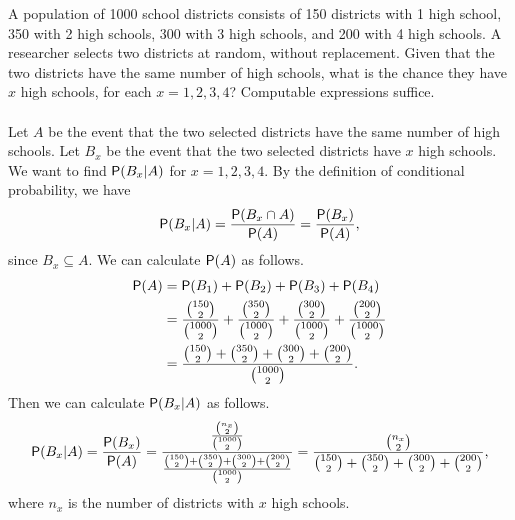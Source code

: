 \documentclass[12pt]{article}
\newcommand{\Prob}{{\sf P}}
\newenvironment{problem}[2][Problem]{\begin{trivlist}
\item[\hskip \labelsep {\bfseries #1}\hskip \labelsep {\bfseries #2.}]}
{\end{trivlist}}
\begin{document}
\begin{problem}{2}
  A population of 1000 school districts consists of 150 districts with 
  1 high school, 350 with 2 high schools, 300 with 3 high schools, 
  and 200 with 4 high schools. A researcher selects two districts at random, 
  without replacement. Given that the two districts
  have the same number of high schools, what is the chance 
  they have $x$ high schools, for each
  $x = 1, 2, 3, 4$? Computable expressions suffice.
  \\\\
  Let $A$ be the event that the two selected districts have the same number of high schools.
  Let $B_x$ be the event that the two selected districts have $x$ high schools.
  We want to find $\Prob(B_x | A)$ for $x = 1, 2, 3, 4$.
  By the definition of conditional probability, we have
  \[
    \Prob(B_x | A) = \frac{\Prob(B_x \cap A)}{\Prob(A)} 
    = \frac{\Prob(B_x)}{\Prob(A)},
  \]
  since $B_x \subseteq A$.
  We can calculate $\Prob(A)$ as follows.
  \[
    \begin{aligned}
      \Prob(A) &= \Prob(B_1) + \Prob(B_2) + \Prob(B_3) + \Prob(B_4) \\
      &= \frac{\binom{150}{2}}{\binom{1000}{2}} 
      + \frac{\binom{350}{2}}{\binom{1000}{2}} 
      + \frac{\binom{300}{2}}{\binom{1000}{2}} 
      + \frac{\binom{200}{2}}{\binom{1000}{2}} \\
      &= \frac{\binom{150}{2} + \binom{350}{2} 
      + \binom{300}{2} + \binom{200}{2}}{\binom{1000}{2}}.
    \end{aligned}
  \]
  Then we can calculate $\Prob(B_x | A)$ as follows.
  \[
    \Prob(B_x | A) = \frac{\Prob(B_x)}{\Prob(A)} 
    = \frac{\frac{\binom{n_x}{2}}{\binom{1000}{2}}}
    {\frac{\binom{150}{2} + \binom{350}{2} + \binom{300}{2} 
    + \binom{200}{2}}{\binom{1000}{2}}}
    = \frac{\binom{n_x}{2}}{\binom{150}{2} + \binom{350}{2} + \binom{300}{2} + \binom{200}{2}},
  \]
  where $n_x$ is the number of districts with $x$ high schools.
\end{problem}
\end{document}
